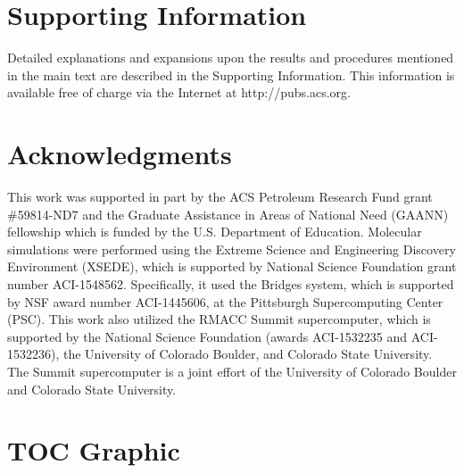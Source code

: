 \documentclass{article}
\begin{document}
  
  \section*{Supporting Information}

  Detailed explanations and expansions upon the results and procedures mentioned in
  the main text are described in the Supporting Information. This information is
  available free of charge via the Internet at http://pubs.acs.org.

  \section*{Acknowledgments}
  This work was supported in part by the ACS Petroleum Research Fund grant \#59814-ND7
  and the Graduate Assistance in Areas of National Need (GAANN)
  fellowship which is funded by the U.S. Department of Education.
  Molecular simulations were performed using the Extreme Science and
  Engineering Discovery Environment (XSEDE), which is supported by National
  Science Foundation grant number ACI-1548562. Specifically, it used the Bridges
  system, which is supported by NSF award number ACI-1445606, at the Pittsburgh
  Supercomputing Center (PSC). This work also utilized the RMACC Summit supercomputer,
  which is supported by the National Science Foundation (awards ACI-1532235 and
  ACI-1532236), the University of Colorado Boulder, and Colorado State
  University. The Summit supercomputer is a joint effort of the University of
  Colorado Boulder and Colorado State University.

  \clearpage

  
  

  \newpage

  \section*{TOC Graphic}
\end{document}
